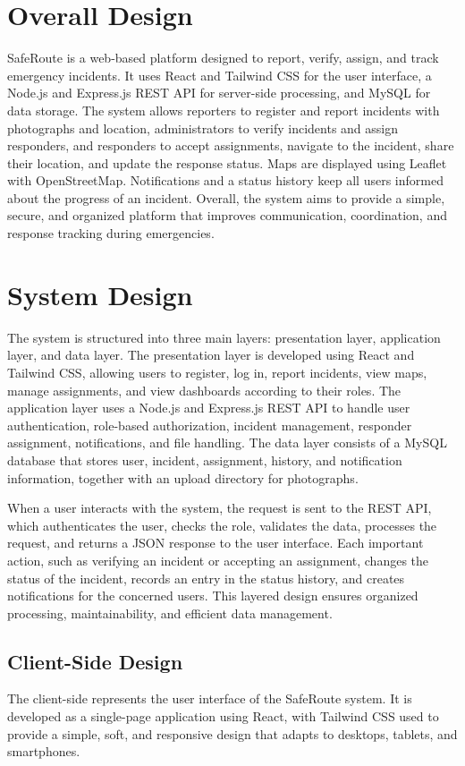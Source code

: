\documentclass[a4paper,12pt]{report}
\begin{document}
	\section{Overall Design}
	SafeRoute is a web-based platform designed to report, verify, assign, and track emergency incidents. It uses React and Tailwind CSS for the user interface, a Node.js and Express.js REST API for server-side processing, and MySQL for data storage. The system allows reporters to register and report incidents with photographs and location, administrators to verify incidents and assign responders, and responders to accept assignments, navigate to the incident, share their location, and update the response status. Maps are displayed using Leaflet with OpenStreetMap. Notifications and a status history keep all users informed about the progress of an incident. Overall, the system aims to provide a simple, secure, and organized platform that improves communication, coordination, and response tracking during emergencies.
	
	\section{System Design}
	The system is structured into three main layers: presentation layer, application layer, and data layer.
	The presentation layer is developed using React and Tailwind CSS, allowing users to register, log in, report incidents, view maps, manage assignments, and view dashboards according to their roles. The application layer uses a Node.js and Express.js REST API to handle user authentication, role-based authorization, incident management, responder assignment, notifications, and file handling. The data layer consists of a MySQL database that stores user, incident, assignment, history, and notification information, together with an upload directory for photographs.
	
	When a user interacts with the system, the request is sent to the REST API, which authenticates the user, checks the role, validates the data, processes the request, and returns a JSON response to the user interface. Each important action, such as verifying an incident or accepting an assignment, changes the status of the incident, records an entry in the status history, and creates notifications for the concerned users. This layered design ensures organized processing, maintainability, and efficient data management.
	
	\subsection{Client-Side Design}
	The client-side represents the user interface of the SafeRoute system. It is developed as a single-page application using React, with Tailwind CSS used to provide a simple, soft, and responsive design that adapts to desktops, tablets, and smartphones.
	
\end{document}
